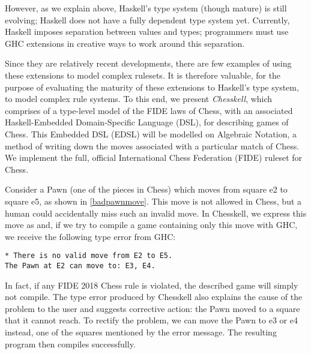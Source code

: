 However, as we explain above, Haskell's type system (though mature) is still evolving; Haskell does not have a fully dependent type system yet. Currently, Haskell imposes separation between values and types; programmers must use GHC extensions in creative ways to work around this separation.

Since they are relatively recent developments, there are few examples of using these extensions to model complex rulesets. It is therefore valuable, for the purpose of evaluating the maturity of these extensions to Haskell's type system, to model complex rule systems. To this end, we present \emph{Chesskell}, which comprises of a type-level model of the FIDE laws of Chess, with an associated Haskell-Embedded Domain-Specific Language (DSL), for describing games of Chess. This Embedded DSL (EDSL) will be modelled on Algebraic Notation, a method of writing down the moves associated with a particular match of Chess. We implement the full, official International Chess Federation (FIDE) ruleset for Chess.


Consider a Pawn (one of the pieces in Chess) which moves from square e2 to square e5, as shown in \cref{badpawnmove}. This move is not allowed in Chess, but a human could accidentally miss such an invalid move. In Chesskell, we express this move as  and, if we try to compile a game containing only this move with GHC, we receive the following type error from GHC:

\begin{verbatim}
* There is no valid move from E2 to E5.
The Pawn at E2 can move to: E3, E4.
\end{verbatim}

In fact, if any FIDE 2018 Chess rule is violated, the described game will simply not compile. The type error produced by Chesskell also explains the cause of the problem to the user and suggests corrective action: the Pawn moved to a square that it cannot reach. To rectify the problem, we can move the Pawn to e3 or e4 instead, one of the squares mentioned by the error message. The resulting program then compiles successfully.

